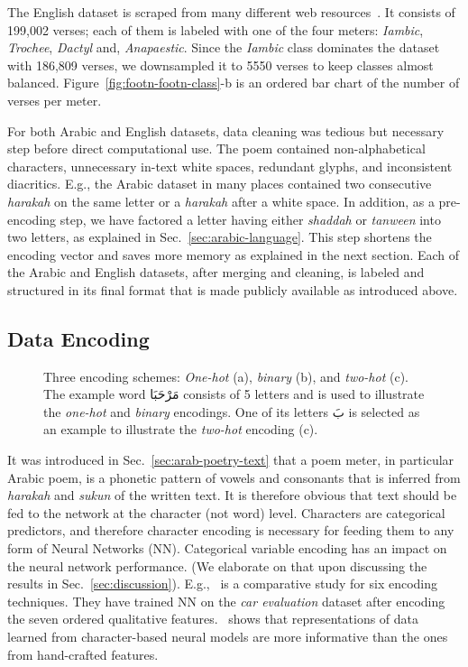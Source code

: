 The English dataset is scraped from many different web
resources~\cite{HuberEighteenthCenturyPoetryArchive}. It consists of 199,002 verses; each of them is
labeled with one of the four meters: \textit{Iambic}, \textit{Trochee}, \textit{Dactyl} and,
\textit{Anapaestic}. Since the \textit{Iambic} class dominates the dataset with 186,809 verses, we
downsampled it to 5550 verses to keep classes almost balanced. Figure~\ref{fig:footn-footn-class}-b
is an ordered bar chart of the number of verses per meter.

\bigskip

For both Arabic and English datasets, data cleaning was tedious but necessary step before direct
computational use. The poem contained non-alphabetical characters, unnecessary in-text white spaces,
redundant glyphs, and inconsistent diacritics. E.g., the Arabic dataset in many places contained two
consecutive \textit{harakah} on the same letter or a \textit{harakah} after a white space. In
addition, as a pre-encoding step, we have factored a letter having either \textit{shaddah} or
\textit{tanween} into two letters, as explained in Sec.~\ref{sec:arabic-language}. This step
shortens the encoding vector and saves more memory as explained in the next section. Each of the
Arabic and English datasets, after merging and cleaning, is labeled and structured in its final
format that is made publicly available \citep{Yousef2018PoemComprehensiveDataset} as introduced
above.


\subsection{Data Encoding}\label{sec:data-encoding}
\begin{figure*}[!tb]
  \centering
  
  \caption{Three encoding schemes: \textit{One-hot} (a), \textit{binary} (b), and \textit{two-hot}
    (c). The example word \textarabic{مَرْحَبَا} consists of 5 letters and is used to illustrate the
    \textit{one-hot} and \textit{binary} encodings. One of its letters \textarabic{بَ} is selected as
    an example to illustrate the \textit{two-hot} encoding (c).}\label{fig:One-Binary-Encoding}
\end{figure*}
It was introduced in Sec.~\ref{sec:arab-poetry-text} that a poem meter, in particular Arabic poem,
is a phonetic pattern of vowels and consonants that is inferred from \textit{harakah} and
\textit{sukun} of the written text. It is therefore obvious that text should be fed to the network
at the character (not word) level. Characters are categorical predictors, and therefore character
encoding is necessary for feeding them to any form of Neural Networks (NN). Categorical variable
encoding has an impact on the neural network performance. (We elaborate on that upon discussing the
results in Sec.~\ref{sec:discussion}). E.g.,~\cite{Potdar2017ComparativeStudyCategoricalVariable} is
a comparative study for six encoding techniques. They have trained NN on the \textit{car evaluation}
dataset after encoding the seven ordered qualitative
features.~\cite{Agirrezabal2017ComparisonFeatureBasedNeural} shows that representations of data
learned from character-based neural models are more informative than the ones from hand-crafted
features.

